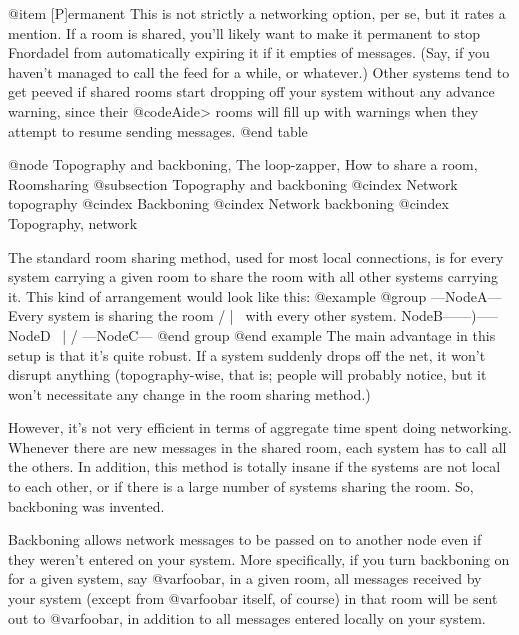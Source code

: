 @item [P]ermanent
This is not strictly a networking option, per se,
but it rates a mention.  If a room is shared, you'll likely
want to make it permanent to stop Fnordadel from
automatically expiring it if it empties of messages.  (Say, 
if you haven't managed to call the feed for a while, or
whatever.)  Other systems tend to get peeved if shared
rooms start dropping off your system without any advance
warning, since their @code{Aide>} rooms will fill up with warnings
when they attempt to resume sending messages.
@end table

@node Topography and backboning, The loop-zapper, How to share a room, Roomsharing
@subsection Topography and backboning
@cindex Network topography
@cindex Backboning
@cindex Network backboning
@cindex Topography, network

The standard room sharing method, used for most
local connections, is for every system carrying a given room to
share the room with all other systems carrying it.  This kind of
arrangement would look like this:
@example
@group
        ---NodeA---          Every system is sharing the room
       /     |     \         with every other system.
  NodeB------)-----NodeD        
       \     |     /    
        ---NodeC---     
@end group
@end example
The main advantage in this setup is that it's quite
robust.  If a system suddenly drops off the net, it won't disrupt
anything (topography-wise, that is; people will probably notice, but it
won't necessitate any change in the room sharing method.)

However, it's not very efficient in terms of aggregate
time spent doing networking.  Whenever there are new messages in
the shared room, each system has to call all the others.  In
addition, this method is totally insane if the systems are not
local to each other, or if there is a large number of
systems sharing the room.  So, backboning was invented.

Backboning allows network messages to be passed on to another
node even if they weren't entered on your system.  More
specifically, if you turn backboning on for a given system, say @var{foobar},
in a given room, all messages received by your system (except
from @var{foobar} itself, of course) in that room will be sent
out to @var{foobar}, in addition to all messages entered locally
on your system.


